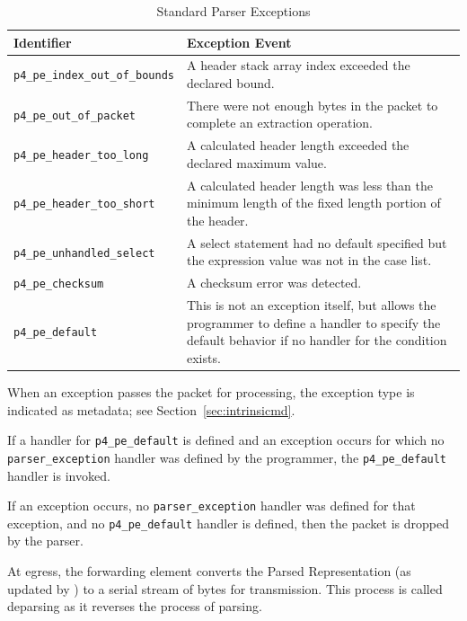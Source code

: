 \documentclass[12pt]{article}
\begin{document}
\begin{table}[H]
\begin{center}
\begin{tabular}{| l | p{} |} \hline
\textbf{Identifier} &
\textbf{Exception Event} \\ \hline
\texttt{p4_pe_index_out_of_bounds} &
A header stack array index exceeded the declared bound. \\ \hline
\texttt{p4_pe_out_of_packet} &
There were not enough bytes in the packet to complete an extraction operation. \\ \hline
\texttt{p4_pe_header_too_long} &
A calculated header length exceeded the declared maximum value. \\ \hline
\texttt{p4_pe_header_too_short} &
A calculated header length was less than the minimum length of the fixed length 
portion of the header. \\ \hline
\texttt{p4_pe_unhandled_select} &
A select statement had no default specified but the expression value was not 
in the case list. \\ \hline
\texttt{p4_pe_checksum} &
A checksum error was detected. \\ \hline
\texttt{p4_pe_default} &
This is not an exception itself, but allows the programmer to define a handler 
to specify the default behavior if no handler for the condition exists. \\
\hline
\end{tabular}
\end{center}
\caption{Standard Parser Exceptions}
\label{tab:parserexceptions}
\end{table}

When an exception passes the packet for \matchaction processing, the exception 
type is indicated as metadata; see Section~\ref{sec:intrinsicmd}.


If a handler for \texttt{p4_pe_default} is defined and an exception occurs for which 
no \\
\texttt{parser_exception} handler was defined by the programmer, the \texttt{p4_pe_default} handler 
is invoked. 

If an exception occurs, no \texttt{parser_exception} handler was defined for that 
exception, and no \texttt{p4_pe_default} handler is defined, then the packet is 
dropped by the parser. 


At egress, the forwarding element converts the Parsed Representation (as updated 
by \matchaction) to a serial stream of bytes for transmission. This process 
is called deparsing as it reverses the process of parsing.
\end{document}

